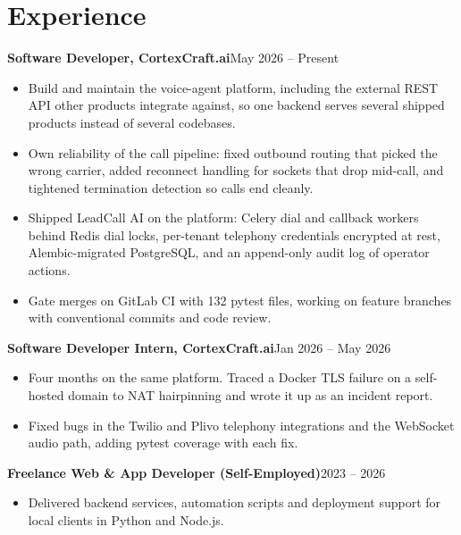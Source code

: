 \documentclass[10pt,a4paper]{article}
\newcommand{\entry}[2]{\textbf{#1}\hfill{#2}\par}
\begin{document}
\section{Experience}
\entry{Software Developer, CortexCraft.ai}{May 2026 -- Present}
\begin{itemize}
  \item Build and maintain the voice-agent platform, including the external REST API other products
        integrate against, so one backend serves several shipped products instead of several codebases.
  \item Own reliability of the call pipeline: fixed outbound routing that picked the wrong carrier,
        added reconnect handling for sockets that drop mid-call, and tightened termination detection
        so calls end cleanly.
  \item Shipped LeadCall AI on the platform: Celery dial and callback workers behind Redis dial locks,
        per-tenant telephony credentials encrypted at rest, Alembic-migrated PostgreSQL, and an
        append-only audit log of operator actions.
  \item Gate merges on GitLab CI with 132 pytest files, working on feature branches with
        conventional commits and code review.
\end{itemize}

\vspace{1pt}
\entry{Software Developer Intern, CortexCraft.ai}{Jan 2026 -- May 2026}
\begin{itemize}
  \item Four months on the same platform. Traced a Docker TLS failure on a self-hosted domain to NAT
        hairpinning and wrote it up as an incident report.
  \item Fixed bugs in the Twilio and Plivo telephony integrations and the WebSocket audio path,
        adding pytest coverage with each fix.
\end{itemize}

\vspace{1pt}
\entry{Freelance Web \& App Developer (Self-Employed)}{2023 -- 2026}
\begin{itemize}
  \item Delivered backend services, automation scripts and deployment support for local clients in
        Python and Node.js.
\end{itemize}
\end{document}
